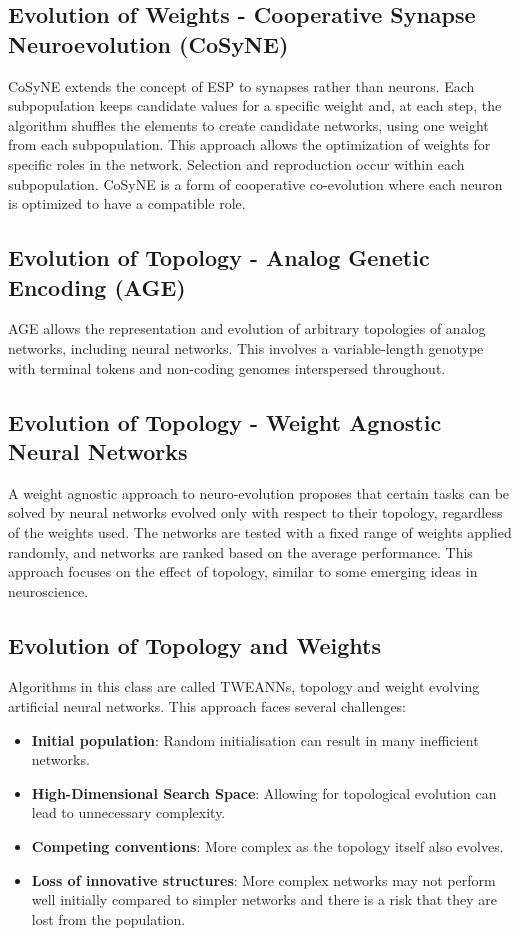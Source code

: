 \subsection*{Evolution of Weights - Cooperative Synapse Neuroevolution (CoSyNE)}
CoSyNE extends the concept of ESP to synapses rather than neurons. Each subpopulation keeps candidate values for a specific weight and, at each step, the algorithm shuffles the elements to create candidate networks, using one weight from each subpopulation. This approach allows the optimization of weights for specific roles in the network. Selection and reproduction occur within each subpopulation. CoSyNE is a form of cooperative co-evolution where each neuron is optimized to have a compatible role.

\subsection*{Evolution of Topology - Analog Genetic Encoding (AGE)}

AGE allows the representation and evolution of arbitrary topologies of analog networks, including neural networks. This involves a variable-length genotype with terminal tokens and non-coding genomes interspersed throughout.

\subsection*{Evolution of Topology - Weight Agnostic Neural Networks}

A weight agnostic approach to neuro-evolution proposes that certain tasks can be solved by neural networks evolved only with respect to their topology, regardless of the weights used. The networks are tested with a fixed range of weights applied randomly, and networks are ranked based on the average performance. This approach focuses on the effect of topology, similar to some emerging ideas in neuroscience.

\subsection*{Evolution of Topology and Weights}
Algorithms in this class are called TWEANNs, topology and weight evolving artificial neural networks. This approach faces several challenges:
\begin{itemize}
    \item \textbf{Initial population}: Random initialisation can result in many inefficient networks.
    \item \textbf{High-Dimensional Search Space}: Allowing for topological evolution can lead to unnecessary complexity.
    \item \textbf{Competing conventions}: More complex as the topology itself also evolves.
    \item \textbf{Loss of innovative structures}: More complex networks may not perform well initially compared to simpler networks and there is a risk that they are lost from the population.
\end{itemize}
